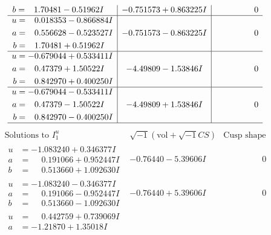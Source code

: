 \documentclass[1p]{elsarticle_modified}
\theoremstyle{definition}
\newcommand{\I}{\sqrt{-1}}
\begin{document}
$$\begin{array}{c|c|c}
\begin{aligned}
b &= \phantom{-}1.70481 - 0.51962 I\end{aligned}
 & -0.751573 + 0.863225 I & \phantom{-0.000000 } 0 \\ \hline\begin{aligned}
u &= \phantom{-}0.018353 - 0.866884 I \\
a &= \phantom{-}0.556628 - 0.523527 I \\
b &= \phantom{-}1.70481 + 0.51962 I\end{aligned}
 & -0.751573 - 0.863225 I & \phantom{-0.000000 } 0 \\ \hline\begin{aligned}
u &= -0.679044 + 0.533411 I \\
a &= \phantom{-}0.47379 + 1.50522 I \\
b &= \phantom{-}0.842970 + 0.400250 I\end{aligned}
 & -4.49809 - 1.53846 I & \phantom{-0.000000 } 0 \\ \hline\begin{aligned}
u &= -0.679044 - 0.533411 I \\
a &= \phantom{-}0.47379 - 1.50522 I \\
b &= \phantom{-}0.842970 - 0.400250 I\end{aligned}
 & -4.49809 + 1.53846 I & \phantom{-0.000000 } 0\\
 \hline 
 \end{array}$$\newpage$$\begin{array}{c|c|c}  
\text{Solutions to }I^u_{1}& \I (\text{vol} + \sqrt{-1}CS) & \text{Cusp shape}\\
 \hline 
\begin{aligned}
u &= -1.083240 + 0.346377 I \\
a &= \phantom{-}0.191066 + 0.952447 I \\
b &= \phantom{-}0.513660 + 1.092630 I\end{aligned}
 & -0.76440 - 5.39606 I & \phantom{-0.000000 } 0 \\ \hline\begin{aligned}
u &= -1.083240 - 0.346377 I \\
a &= \phantom{-}0.191066 - 0.952447 I \\
b &= \phantom{-}0.513660 - 1.092630 I\end{aligned}
 & -0.76440 + 5.39606 I & \phantom{-0.000000 } 0 \\ \hline\begin{aligned}
u &= \phantom{-}0.442759 + 0.739069 I \\
a &= -1.21870 + 1.35018 I \\

\end{aligned}
\end{array}$$
\end{document}
